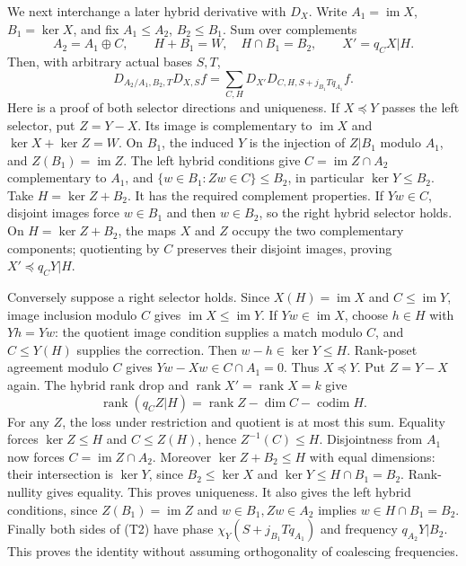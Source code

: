 We next interchange a later hybrid derivative with $D_X$.
Write $A_1=\operatorname{im}X$, $B_1=\ker X$, and fix
$A_1\le A_2$, $B_2\le B_1$. Sum over complements
\[
 A_2=A_1\oplus C,\qquad H+B_1=W,\quad H\cap B_1=B_2,
 \qquad X'=q_CX|H.
\]
Then, with arbitrary actual bases $S,T$,
\[
 D_{A_2/A_1,B_2,T}D_{X,S}f
  =\sum_{C,H}D_{X'}D_{C,H,S+j_{B_1}Tq_{A_1}}f.       \tag{T2}
\]
Here is a proof of both selector directions and uniqueness.
If $X\preceq Y$ passes the left selector, put $Z=Y-X$.
Its image is complementary to $\operatorname{im}X$ and
$\ker X+\ker Z=W$. On $B_1$, the induced $Y$ is the injection of
$Z|B_1$ modulo $A_1$, and $Z(B_1)=\operatorname{im}Z$.
The left hybrid conditions give
$C=\operatorname{im}Z\cap A_2$ complementary to $A_1$, and
$\{w\in B_1:Zw\in C\}\le B_2$, in particular $\ker Y\le B_2$.
Take $H=\ker Z+B_2$. It has the required complement properties.
If $Yw\in C$, disjoint images force $w\in B_1$ and then $w\in B_2$,
so the right hybrid selector holds. On $H=\ker Z+B_2$, the maps $X$
and $Z$ occupy the two complementary components; quotienting by $C$
preserves their disjoint images, proving $X'\preceq q_CY|H$.

Conversely suppose a right selector holds. Since $X(H)=\operatorname{im}X$
and $C\le\operatorname{im}Y$, image inclusion modulo $C$ gives
$\operatorname{im}X\le\operatorname{im}Y$.
If $Yw\in\operatorname{im}X$, choose $h\in H$ with $Yh=Yw$:
the quotient image condition supplies a match modulo $C$, and
$C\le Y(H)$ supplies the correction. Then $w-h\in\ker Y\le H$.
Rank-poset agreement modulo $C$ gives $Yw-Xw\in C\cap A_1=0$.
Thus $X\preceq Y$. Put $Z=Y-X$ again. The hybrid rank drop and
$\operatorname{rank}X'=\operatorname{rank}X=k$ give
\[
 \operatorname{rank}(q_CZ|H)
  =\operatorname{rank}Z-\dim C-\operatorname{codim}H.
\]
For any $Z$, the loss under restriction and quotient is at most this
sum. Equality forces $\ker Z\le H$ and $C\le Z(H)$, hence
$Z^{-1}(C)\le H$. Disjointness from $A_1$ now forces
$C=\operatorname{im}Z\cap A_2$.
Moreover $\ker Z+B_2\le H$ with equal dimensions: their intersection
is $\ker Y$, since $B_2\le\ker X$ and
$\ker Y\le H\cap B_1=B_2$. Rank-nullity gives equality.
This proves uniqueness. It also gives the left hybrid conditions,
since $Z(B_1)=\operatorname{im}Z$ and
$w\in B_1,Zw\in A_2$ implies $w\in H\cap B_1=B_2$.
Finally both sides of (T2) have phase
$\chi_Y(S+j_{B_1}Tq_{A_1})$ and frequency $q_{A_2}Y|B_2$.
This proves the identity without assuming orthogonality of coalescing
frequencies.

